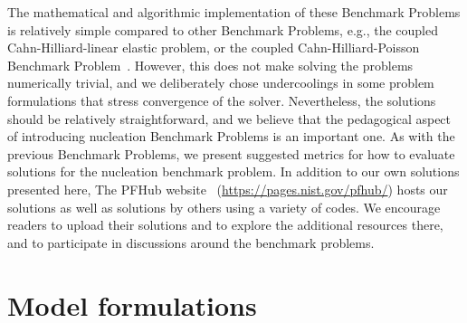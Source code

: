 \documentclass[preprint,12pt]{elsarticle}
\begin{document}
The mathematical and algorithmic implementation of these Benchmark Problems is relatively simple compared to other Benchmark Problems, e.g., the coupled Cahn-Hilliard-linear elastic problem, or the coupled Cahn-Hilliard-Poisson Benchmark Problem~\cite{jokisaari2017dendrite,jokisaari2020stokes}. However, this does not make solving the problems numerically trivial, and we deliberately chose undercoolings in some problem formulations that stress convergence of the solver. Nevertheless, the solutions should be relatively straightforward, and we believe that the pedagogical aspect of introducing nucleation Benchmark Problems is an important one.  
As with the previous Benchmark Problems, we present suggested metrics for how to evaluate solutions for the nucleation benchmark problem. In addition to our own solutions presented here, The PFHub website~\cite{wheeler2019pfhub} (\url{https://pages.nist.gov/pfhub/})  hosts our solutions as well as solutions by others using a variety of codes. %
We encourage readers to upload their solutions and to explore the additional resources there, and to participate in discussions around the benchmark problems. 

\section{Model formulations}
\end{document}
